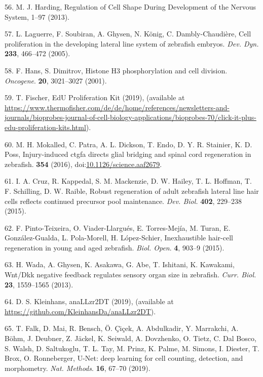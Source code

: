 \documentclass[11pt,singlespacinge,twoside]{reedthesis} %
\begin{document}
\leavevmode\hypertarget{ref-Harding2013}{}%
56. M. J. Harding, Regulation of Cell Shape During Development of the Nervous System, 1--97 (2013).

\leavevmode\hypertarget{ref-Laguerre2005a}{}%
57. L. Laguerre, F. Soubiran, A. Ghysen, N. König, C. Dambly-Chaudière, Cell proliferation in the developing lateral line system of zebrafish embryos. \emph{Dev. Dyn.} \textbf{233}, 466--472 (2005).

\leavevmode\hypertarget{ref-Hans2001}{}%
58. F. Hans, S. Dimitrov, Histone H3 phosphorylation and cell division. \emph{Oncogene}. \textbf{20}, 3021--3027 (2001).

\leavevmode\hypertarget{ref-Fischer}{}%
59. T. Fischer, EdU Proliferation Kit (2019), (available at \url{https://www.thermofisher.com/de/de/home/references/newsletters-and-journals/bioprobes-journal-of-cell-biology-applications/bioprobes-70/click-it-plus-edu-proliferation-kits.html}).

\leavevmode\hypertarget{ref-Mokalled2016}{}%
60. M. H. Mokalled, C. Patra, A. L. Dickson, T. Endo, D. Y. R. Stainier, K. D. Poss, Injury-induced ctgfa directs glial bridging and spinal cord regeneration in zebrafish. \textbf{354} (2016), doi:\href{https://doi.org/10.1126/science.aaf2679}{10.1126/science.aaf2679}.

\leavevmode\hypertarget{ref-Cruz2015}{}%
61. I. A. Cruz, R. Kappedal, S. M. Mackenzie, D. W. Hailey, T. L. Hoffman, T. F. Schilling, D. W. Raible, Robust regeneration of adult zebrafish lateral line hair cells reflects continued precursor pool maintenance. \emph{Dev. Biol.} \textbf{402}, 229--238 (2015).

\leavevmode\hypertarget{ref-Pinto-Teixeira2015}{}%
62. F. Pinto-Teixeira, O. Viader-Llargués, E. Torres-Mejía, M. Turan, E. González-Gualda, L. Pola-Morell, H. López-Schier, Inexhaustible hair-cell regeneration in young and aged zebrafish. \emph{Biol. Open}. \textbf{4}, 903--9 (2015).

\leavevmode\hypertarget{ref-Wada2013}{}%
63. H. Wada, A. Ghysen, K. Asakawa, G. Abe, T. Ishitani, K. Kawakami, Wnt/Dkk negative feedback regulates sensory organ size in zebrafish. \emph{Curr. Biol.} \textbf{23}, 1559--1565 (2013).

\leavevmode\hypertarget{ref-Kleinhansa}{}%
64. D. S. Kleinhans, anaLLzr2DT (2019), (available at \url{https://github.com/KleinhansDa/anaLLzr2DT}).

\leavevmode\hypertarget{ref-Falk2019}{}%
65. T. Falk, D. Mai, R. Bensch, Ö. Çiçek, A. Abdulkadir, Y. Marrakchi, A. Böhm, J. Deubner, Z. Jäckel, K. Seiwald, A. Dovzhenko, O. Tietz, C. Dal Bosco, S. Walsh, D. Saltukoglu, T. L. Tay, M. Prinz, K. Palme, M. Simons, I. Diester, T. Brox, O. Ronneberger, U-Net: deep learning for cell counting, detection, and morphometry. \emph{Nat. Methods}. \textbf{16}, 67--70 (2019).
\end{document}
